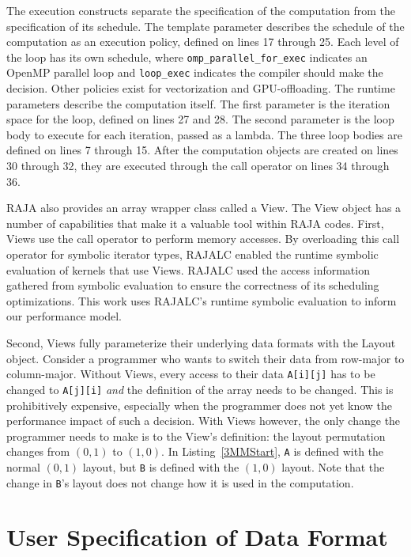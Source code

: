 \documentclass[sigconf]{acmart}
\begin{document}
The execution constructs separate the specification of the computation from the specification of its schedule.
The template parameter describes the schedule of the computation as an execution policy, defined on lines 17 through 25.
Each level of the loop has its own schedule, where \verb.omp_parallel_for_exec. indicates an OpenMP parallel loop and \verb.loop_exec. indicates the compiler should make the decision.
Other policies exist for vectorization and GPU-offloading.
The runtime parameters describe the computation itself. 
The first parameter is the iteration space for the loop, defined on lines 27 and 28. 
The second parameter is the loop body to execute for each iteration, passed as a lambda.
The three loop bodies are defined on lines 7 through 15.
After the computation objects are created on lines 30 through 32, they are executed through the call operator on lines 34 through 36.

RAJA also provides an array wrapper class called a View.
The View object has a number of capabilities that make it a valuable tool within RAJA codes.
First, Views use the call operator to perform memory accesses. 
By overloading this call operator for symbolic iterator types, RAJALC enabled the runtime symbolic evaluation of kernels that use Views.
RAJALC used the access information gathered from symbolic evaluation to ensure the correctness of its scheduling optimizations.
This work uses RAJALC's runtime symbolic evaluation to inform our performance model.

Second, Views fully parameterize their underlying data formats with the Layout object.
Consider a programmer who wants to switch their data from row-major to column-major. 
Without Views, every access to their data \verb.A[i][j]. has to be changed to \verb.A[j][i]. \textit{and} the definition of the array needs to be changed. 
This is prohibitively expensive, especially when the programmer does not yet know the performance impact of such a decision.
With Views however, the only change the programmer needs to make is to the View's definition: the layout permutation changes from $(0,1)$ to $(1,0)$. 
In Listing~\ref{3MMStart}, \verb.A. is defined with the normal $(0,1)$ layout, but \verb.B. is defined with the $(1,0)$ layout. 
Note that the change in \verb.B.'s layout does not change how it is used in the computation. 




\section{User Specification of Data Format}
\end{document}
